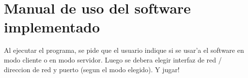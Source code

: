 \section{Manual de uso del software implementado}
Al ejecutar el programa, se pide que el usuario indique si se usar'a el software en modo cliente o en modo servidor. Luego se debera elegir interfaz de red / direccion de red y puerto (segun el modo elegido). Y jugar!
